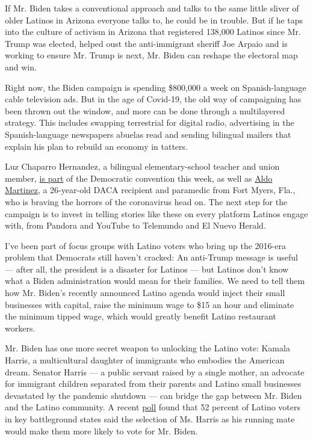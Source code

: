 If Mr. Biden takes a conventional approach and talks to the same little
sliver of older Latinos in Arizona everyone talks to, he could be in
trouble. But if he taps into the culture of activism in Arizona that
registered 138,000 Latinos since Mr. Trump was elected, helped oust the
anti-immigrant sheriff Joe Arpaio and is working to ensure Mr. Trump is
next, Mr. Biden can reshape the electoral map and win.

Right now, the Biden campaign is spending \$800,000 a week on
Spanish-language cable television ads. But in the age of Covid-19, the
old way of campaigning has been thrown out the window, and more can be
done through a multilayered strategy. This includes swapping terrestrial
for digital radio, advertising in the Spanish-language newspapers
abuelas read and sending bilingual mailers that explain his plan to
rebuild an economy in tatters.

Luz Chaparro Hernandez, a bilingual elementary-school teacher and union
member,
\href{https://www.jsonline.com/story/news/politics/elections/2020/08/10/democratic-national-convention-speakers-milwaukee-include-teacher-retiree/3333188001/}{is
part} of the Democratic convention this week, as well as
\href{https://www.news-press.com/story/news/2020/08/10/fort-myers-man-give-virtual-speech-democratic-national-convention/3332617001/}{Aldo
Martinez}, a 26-year-old DACA recipient and paramedic from Fort Myers,
Fla., who is braving the horrors of the coronavirus head on. The next
step for the campaign is to invest in telling stories like these on
every platform Latinos engage with, from Pandora and YouTube to
Telemundo and El Nuevo Herald.

I've been part of focus groups with Latino voters who bring up the
2016-era problem that Democrats still haven't cracked: An anti-Trump
message is useful --- after all, the president is a disaster for Latinos
--- but Latinos don't know what a Biden administration would mean for
their families. We need to tell them how Mr. Biden's recently announced
Latino agenda would inject their small businesses with capital, raise
the minimum wage to \$15 an hour and eliminate the minimum tipped wage,
which would greatly benefit Latino restaurant workers.

Mr. Biden has one more secret weapon to unlocking the Latino vote:
Kamala Harris, a multicultural daughter of immigrants who embodies the
American dream. Senator Harris --- a public servant raised by a single
mother, an advocate for immigrant children separated from their parents
and Latino small businesses devastated by the pandemic shutdown --- can
bridge the gap between Mr. Biden and the Latino community. A recent
\href{https://latinodecisions.com/wp-content/uploads/2020/07/VPC-Latino-Decisions-June-2020-CROSSTABS.pdf?utm_medium=email\&utm_campaign=New\%20From\%20Latino\%20Decisions\%20-\%20title\%202020-08-11\%20181609\&utm_content=New\%20From\%20Latino\%20Decisions\%20-\%20title\%202020-08-11\%20181609+CID_df93fb1bb6deb24f993668c82850b2dd\&utm_source=Email\%20marketing\%20software\&utm_term=poll}{poll}
found that 52 percent of Latino voters in key battleground states said
the selection of Ms. Harris as his running mate would make them more
likely to vote for Mr. Biden.

